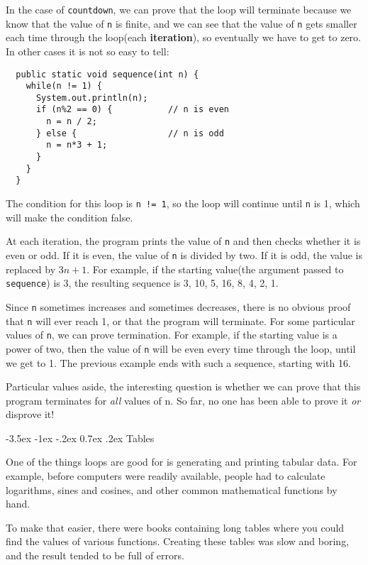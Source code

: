 \documentclass{book}
\makeatletter
\renewcommand{\section}{\@startsection 
    {section} {1} {0mm}%
    {-3.5ex \@plus -1ex \@minus -.2ex}%
    {0.7ex \@plus.2ex}%
    {\normalfont\Large\bfseries}}
\makeatother
\begin{document}
In the case of {\tt countdown}, we can prove that the loop
will terminate because we know that the value of {\tt n} is
finite, and we can see that the value of {\tt n} gets smaller
each time through the loop(each {\bf iteration}), so
eventually we have to get to zero.  In other cases it is not
so easy to tell:

\begin{verbatim}
  public static void sequence(int n) {
    while(n != 1) {
      System.out.println(n);
      if (n%2 == 0) {           // n is even
        n = n / 2;
      } else {                  // n is odd
        n = n*3 + 1;
      }
    }
  }
\end{verbatim}
%
The condition for this loop is {\tt n != 1}, so the loop
will continue until {\tt n} is 1, which will make the condition
false.

At each iteration, the program prints the value of {\tt n} and then
checks whether it is even or odd.  If it is even, the value of
{\tt n} is divided by two.  If it is odd, the value is replaced
by $3n+1$.  For example, if the starting value(the argument passed
to {\tt sequence}) is 3, the resulting sequence is
3, 10, 5, 16, 8, 4, 2, 1.

Since {\tt n} sometimes increases and sometimes decreases, there is no
obvious proof that {\tt n} will ever reach 1, or that the program will
terminate.  For some particular values of {\tt n}, we can prove
termination.  For example, if the starting value is a power of two, then
the value of {\tt n} will be even every time through the loop, until
we get to 1.  The previous example ends with such a sequence,
starting with 16.

Particular values aside, the interesting question is whether
we can prove that this program terminates for {\em all} values of n.
So far, no one has been able to prove it {\em or} disprove it!

\section{Tables}

One of the things loops are good for is generating and printing
tabular data.  For example, before computers were readily
available, people had to calculate logarithms,
sines and cosines, and other common mathematical functions
by hand.

To make that easier, there were books containing long tables
where you could find the values of various functions.
Creating these tables was slow and boring, and the result
tended to be full of errors.
\end{document}
